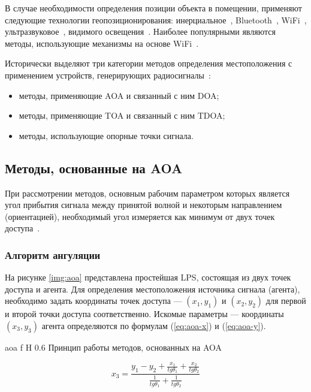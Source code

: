 В случае необходимости определения позиции объекта в помещении, применяют следующие технологии геопозиционирования: инерциальное~\cite{inertial}, Bluetooth~\cite{bluetooth}, WiFi~\cite{wifi}, ультразвуковое~\cite{ultrasound}, видимого освещения~\cite{light}. Наиболее популярными являются методы, использующие механизмы на основе WiFi~\cite{trends}.

Исторически выделяют три категории методов определения местоположения с применением устройств, генерирующих радиосигналы~\cite{wlan}:

\begin{itemize}[label=---]
    \item методы, применяющие AOA и связанный с ним DOA;
    \item методы, применяющие TOA и связанный с ним TDOA;
    \item методы, использующие опорные точки сигнала.
\end{itemize}

\subsection{Методы, основанные на AOA}

При рассмотрении методов, основным рабочим параметром которых является угол прибытия сигнала между принятой волной и некоторым направлением (ориентацией), необходимый угол измеряется как минимум от двух точек доступа~\cite{aoa}. 

\subsubsection{Алгоритм ангуляции}

На рисунке \ref{img:aoa} представлена простейшая LPS, состоящая из двух точек доступа и агента. Для определения местоположения источника сигнала (агента), необходимо задать координаты точек доступа --- $(x_1, y_1)$ и $(x_2, y_2)$ для первой и второй точки доступа соответственно. Искомые параметры --- координаты $(x_3, y_3)$ агента определяются по формулам (\ref{eq:aoa-x}) и (\ref{eq:aoa-y}).

    {aoa}
    {f}
    {H}
    {0.6\linewidth}
    {Принцип работы методов, основанных на AOA}

\begin{equation}
    x_3 = \frac{y_1 - y_2 + \frac{x_1}{tg\theta_1} + \frac{x_2}{tg\theta_2}}{\frac{1}{tg\theta_1} + \frac{1}{tg\theta_2}}
    \label{eq:aoa-x}
\end{equation}

